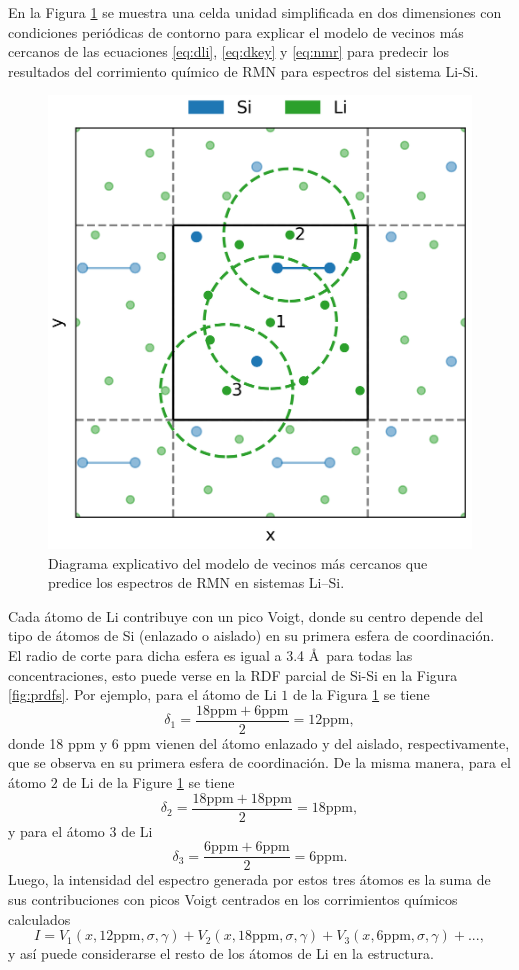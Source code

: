 En la Figura \ref{fig:viz} se muestra una celda unidad simplificada en dos
dimensiones con condiciones periódicas de contorno para explicar el modelo
de vecinos más cercanos de las ecuaciones \ref{eq:dli}, \ref{eq:dkey} y \ref{eq:nmr}
para predecir los resultados del corrimiento químico de RMN para espectros 
del sistema Li-Si.
\begin{figure}[h!]
    \centering
    \includegraphics[width=.5\textwidth]{Silicio/prediccion/resultados/nmr/viz.png}
    \caption{Diagrama explicativo del modelo de vecinos más cercanos que predice los
    espectros de RMN en sistemas Li--Si.} 
    \label{fig:viz}
\end{figure}
Cada átomo de Li contribuye con un pico Voigt, donde su centro
depende del tipo de átomos de Si (enlazado o aislado) en su primera esfera de 
coordinación. El radio de corte para dicha esfera es igual a 3.4 \AA\ para todas 
las concentraciones, esto puede verse en la RDF parcial de Si-Si en la Figura 
\ref{fig:prdfs}. Por ejemplo, para el átomo de Li $1$ de la Figura \ref{fig:viz} se tiene
\begin{equation}
    \delta_1 = \frac{18 \text{ppm} + 6 \text{ppm}}{2} = 12 \text{ppm},
\end{equation}
donde 18 ppm y 6 ppm vienen del átomo enlazado y del aislado, respectivamente,
que se observa en su primera esfera de coordinación. De la misma manera, para 
el átomo $2$ de Li de la Figure \ref{fig:viz} se tiene 
\begin{equation}
    \delta_2 = \frac{18 \text{ppm} + 18 \text{ppm}}{2} = 18 \text{ppm},
\end{equation}
y para el átomo $3$ de Li
\begin{equation}
    \delta_3 = \frac{6 \text{ppm} + 6 \text{ppm}}{2} = 6 \text{ppm}.
\end{equation}
Luego, la intensidad del espectro generada por estos tres átomos es la suma
de sus contribuciones con picos Voigt centrados en los corrimientos químicos
calculados
\begin{equation}
    I = V_1(x, 12 \text{ppm}, \sigma, \gamma) + V_2(x, 18 \text{ppm}, \sigma, \gamma) + V_3(x, 6 \text{ppm}, \sigma, \gamma) + ...,
\end{equation}
y así puede considerarse el resto de los átomos de Li en la estructura.

